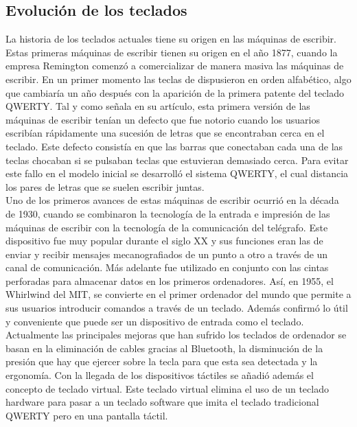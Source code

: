 \subsection{Evoluci\'on de los teclados}

La historia de los teclados actuales tiene su origen en las m\'aquinas de escribir. Estas primeras m\'aquinas de escribir tienen su origen en el a\~no 1877, cuando la empresa Remington comenz\'o a comercializar de manera masiva las m\'aquinas de escribir. En un primer momento las teclas de dispusieron en orden alfab\'etico, algo que cambiar\'ia un a\~no despu\'es con la aparici\'on de la primera patente del teclado QWERTY. Tal y como se\~nala \cite{jimmy} en su art\'iculo, esta primera versi\'on de las m\'aquinas de escribir ten\'ian un defecto que fue notorio cuando los usuarios escrib\'ian r\'apidamente una sucesi\'on de letras que se encontraban cerca en el teclado. Este defecto consist\'ia en que las barras que conectaban cada una de las teclas chocaban si se pulsaban teclas que estuvieran demasiado cerca.  Para evitar este fallo en el modelo inicial se desarroll\'o el sistema QWERTY, el cual distancia los pares de letras que se suelen escribir juntas.\\

Uno de los primeros avances de estas m\'aquinas de escribir ocurri\'o en la d\'ecada de 1930, cuando se combinaron la tecnolog\'ia de la entrada e impresi\'on de las m\'aquinas de escribir con la tecnolog\'ia de la comunicaci\'on del tel\'egrafo. Este dispositivo fue muy popular durante el siglo XX y sus funciones eran las de enviar y recibir mensajes mecanografiados de un punto a otro a trav\'es de un canal de comunicaci\'on. M\'as adelante fue utilizado en conjunto con las cintas perforadas para almacenar datos en los primeros ordenadores. As\'i, en 1955, el Whirlwind del MIT, se convierte en el primer ordenador del mundo que permite a sus usuarios introducir comandos a trav\'es de un teclado. Adem\'as confirm\'o lo \'util y conveniente que puede ser un dispositivo de entrada como el teclado.\\

Actualmente las principales mejoras que han sufrido los teclados de ordenador se basan en la eliminaci\'on de cables gracias al Bluetooth, la disminuci\'on de la presi\'on que hay que ejercer sobre la tecla para que esta sea detectada y la ergonom\'ia. Con la llegada de los dispositivos t\'actiles se a\~nadi\'o adem\'as el concepto de teclado virtual. Este teclado virtual elimina el uso de un teclado hardware para pasar a un teclado software que imita el teclado tradicional QWERTY pero en una pantalla t\'actil. \\

